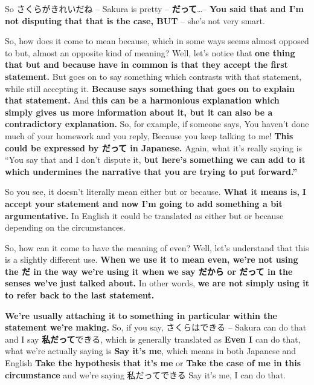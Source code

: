 \thinrule

So さくらがきれいだね -- Sakura is pretty -- {\bf だって}\ldots{}-- {\bf You said that and I'm not disputing that that is the case, BUT} -- she's not very smart.

\stopsectionlevel

\startsectionlevel[title={だって as because},reference={だって-as-because}]

So, how does it come to mean because, which in some ways seems almost opposed to but, almost an opposite kind of meaning? Well, let's notice that {\bf one thing that but and because have in common is that they accept the first statement.} But goes on to say something which contrasts with that statement, while still accepting it. {\bf Because says something that goes on to explain that statement.} And {\bf this can be a harmonious explanation which simply gives us more information about it, but it can also be a contradictory explanation.} So, for example, if someone says, You haven't done much of your homework and you reply, Because you keep talking to me! {\bf This could be expressed by だって in Japanese.} Again, what it's really saying is “You say that and I don't dispute it, {\bf but here's something} {\bf we can add to it which undermines the narrative that you are trying to put forward.”}

\thinrule

So you see, it doesn't literally mean either but or because. {\bf What it means is,} {\bf I accept your statement and now I'm going to add something a bit argumentative.} In English it could be translated as either but or because depending on the circumstances.

\stopsectionlevel

\startsectionlevel[title={だって as even},reference={だって-as-even}]

So, how can it come to have the meaning of even? Well, let's understand that this is a slightly different use. {\bf When we use it to mean even, we're not using the だ in the way we're using it when we say だから or だって in the senses we've just talked about.} In other words, {\bf we are not simply using it to refer back to the last statement.}

\thinrule

{\bf We're usually attaching it to something in particular within the statement we're making.} So, if you say, さくらはできる -- Sakura can do that and I say {\bf 私だって}できる, which is generally translated as {\bf Even I} can do that, what we're actually saying is {\bf Say it's me}, which means in both Japanese and English {\bf Take the hypothesis that it's me} or {\bf Take the case of me in this circumstance} and we're saying 私だってできる Say it's me, I can do that.

